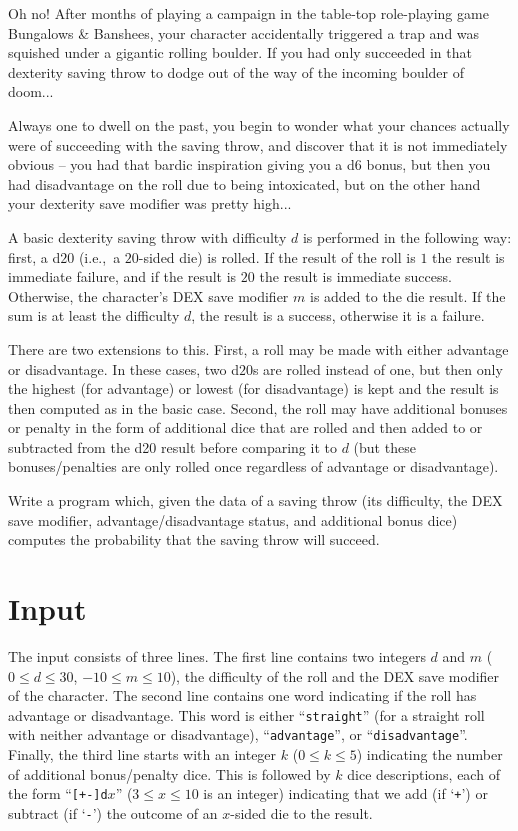 
%
\noindent
Oh no!  After months of playing a campaign in the table-top
role-playing game Bungalows \& Banshees, your character accidentally
triggered a trap and was squished under a gigantic rolling boulder.
If you had only succeeded in that dexterity saving throw to dodge out
of the way of the incoming boulder of doom...

Always one to dwell on the past, you begin to wonder what your chances
actually were of succeeding with the saving throw, and discover that
it is not immediately obvious -- you had that bardic inspiration
giving you a d6 bonus, but then you had disadvantage on the roll due
to being intoxicated, but on the other hand your dexterity save
modifier was pretty high...

A basic dexterity saving throw with difficulty $d$ is performed in the
following way: first, a d$20$ (i.e.,~a $20$-sided die) is rolled.  If
the result of the roll is $1$ the result is immediate failure, and if
the result is $20$ the result is immediate success.  Otherwise, the
character's DEX save modifier $m$ is added to the die result.  If the
sum is at least the difficulty $d$, the result is a success, otherwise
it is a failure.

There are two extensions to this.  First, a roll may be made with
either advantage or disadvantage.  In these cases, two d$20$s are
rolled instead of one, but then only the highest (for advantage) or
lowest (for disadvantage) is kept and the result is then computed as
in the basic case.  Second, the roll may have additional bonuses or
penalty in the form of additional dice that are rolled and then added
to or subtracted from the d20 result before comparing it to $d$ (but
these bonuses/penalties are only rolled once regardless of advantage or disadvantage).

Write a program which, given the data of a saving throw (its
difficulty, the DEX save modifier, advantage/disadvantage status, and
additional bonus dice) computes the probability that the saving throw
will succeed.

\section*{Input}

The input consists of three lines.  The first line contains two
integers $d$ and $m$ ($0 \le d \le 30$, $-10 \le m \le 10$), the
difficulty of the roll and the DEX save modifier of the character.
The second line contains one word indicating if the roll has advantage
or disadvantage.  This word is either ``\texttt{straight}'' (for a
straight roll with neither advantage or disadvantage),
``\texttt{advantage}'', or ``\texttt{disadvantage}''.  Finally, the
third line starts with an integer $k$ ($0 \le k \le 5$) indicating the
number of additional bonus/penalty dice.  This is followed by $k$
dice descriptions, each of the form ``\texttt{[+-]d$x$}'' ($3 \le x \le 10$ is
an integer) indicating that we add (if `\texttt{+}') or subtract (if
`\texttt{-}') the outcome of an $x$-sided die to the result.

